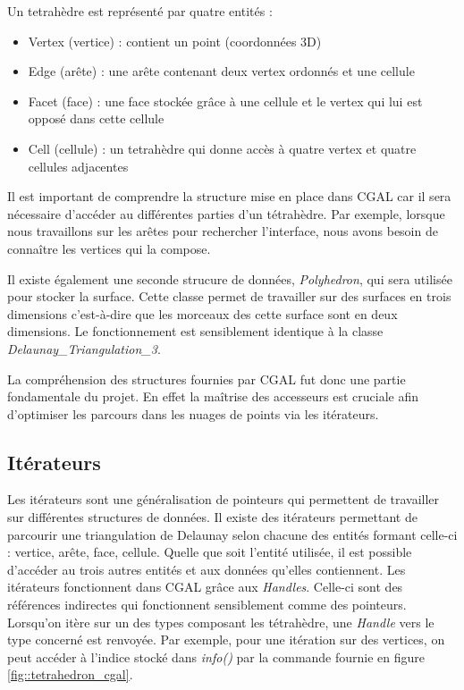 Un tetrahèdre est représenté par quatre entités :
\begin{itemize}
  \item Vertex (vertice) : contient un point (coordonnées 3D)
  \item Edge (arête) : une arête contenant deux vertex ordonnés et une cellule
  \item Facet (face) : une face stockée grâce à une cellule et le vertex qui lui est opposé dans cette cellule
  \item Cell (cellule) : un tetrahèdre qui donne accès à quatre vertex et quatre cellules adjacentes
\end{itemize}

Il est important de comprendre la structure mise en place dans CGAL car il sera
nécessaire d'accéder au différentes parties d'un tétrahèdre. Par exemple, lorsque
nous travaillons sur les arêtes pour rechercher l'interface, nous avons besoin de
connaître les vertices qui la compose.

Il existe également une seconde strucure de données, \textit{Polyhedron}, qui sera
utilisée pour stocker la surface. Cette classe permet de travailler sur des surfaces
en trois dimensions c'est-à-dire que les morceaux des cette surface sont en deux dimensions.
Le fonctionnement est sensiblement identique à la classe \textit{Delaunay\_Triangulation\_3}.

La compréhension des structures fournies par CGAL fut donc une partie fondamentale du
projet. En effet la maîtrise des accesseurs est cruciale afin d'optimiser les parcours
dans les nuages de points via les itérateurs.





\subsection*{Itérateurs}

Les itérateurs sont une généralisation de pointeurs qui permettent de travailler sur
différentes structures de données.
Il existe des itérateurs permettant de parcourir une triangulation de Delaunay
selon chacune des entités formant celle-ci : vertice, arête, face, cellule. Quelle
que soit l'entité utilisée, il est possible d'accéder au trois autres entités et
aux données qu'elles contiennent. Les itérateurs fonctionnent dans CGAL grâce aux
\textit{Handles}. Celle-ci sont des références indirectes qui fonctionnent sensiblement
comme des pointeurs. Lorsqu'on itère sur un des types composant les tétrahèdre, une
\textit{Handle} vers le type concerné est renvoyée. Par exemple, pour une itération sur des
vertices, on peut accéder à l'indice stocké dans \textit{info()} par la commande
fournie en figure \ref{fig::tetrahedron_cgal}.

